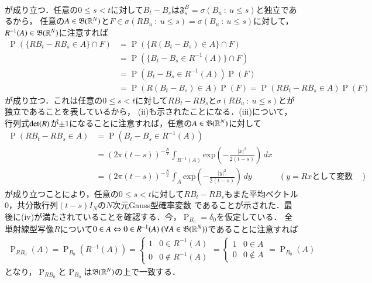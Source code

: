 \begin{prf}
\begin{description}
\begin{align}
		\end{align}
		が成り立つ．任意の$0 \leq s < t$に対して$B_t - B_s$は$\mathfrak{F}_s^B = \sigma(B_u\ :\ u \leq s)$と独立であるから，
		任意の$A \in \mathfrak{B}(\mathbb{R}^N)$と$F \in \sigma(RB_u\ :\ u \leq s) = \sigma(B_u\ :\ u \leq s)$に対して，
		$R^{-1}(A) \in \mathfrak{B}(\mathbb{R}^N)$に注意すれば
		\begin{align}
			\operatorname{P}\left(\{RB_t - RB_s \in A\} \cap F \right) 
			&= \operatorname{P}\left(\{R(B_t - B_s) \in A\} \cap F \right) \\
			&= \operatorname{P}\left(\{B_t - B_s \in R^{-1}(A)\} \cap F \right) \\
			&= \operatorname{P}\left(B_t - B_s \in R^{-1}(A)\right)\operatorname{P}(F) \\
			&= \operatorname{P}\left(R(B_t - B_s) \in A\right)\operatorname{P}(F)
			= \operatorname{P}\left(RB_t - RB_s \in A\right)\operatorname{P}(F)
		\end{align}
		が成り立つ．これは任意の$0 \leq s < t$に対して$RB_t - RB_s$と$\sigma(RB_u\ :\ u \leq s)$とが独立であることを表しているから，
		(ii)も示されたことになる．(iii)について，行列式$\operatorname{det} ( R )$が$\pm 1$になることに注意すれば，任意の$A \in \mathfrak{B}(\mathbb{R}^N)$に対して
		\begin{align}
			\operatorname{P}(RB_t - RB_s \in A) &= \operatorname{P}\left(B_t - B_s \in R^{-1}(A)\right) \\
			&= (2\pi(t-s))^{-\frac{N}{2}} \int_{R^{-1}(A)} \mathrm{exp}\left( -\frac{|x|^2}{2(t-s)} \right)\, dx \\
			&= (2\pi(t-s))^{-\frac{N}{2}} \int_{A} \mathrm{exp}\left( -\frac{|y|^2}{2(t-s)} \right)\, dy & \left(y = Rx\mbox{として変数変換}\right)
		\end{align}
		が成り立つことにより，任意の$0 \leq s < t$に対して$RB_t - RB_s$もまた平均ベクトル0，共分散行列$(t-s)I_N$の$N$次元Gauss型確率変数
		であることが示された．最後に(iv)が満たされていることを確認する．今，$\operatorname{P}_{B_0} = \delta_0$を仮定している．
		全単射線型写像$R$について$0 \in A \Leftrightarrow 0 \in R^{-1}(A)\ (\forall A \in \mathfrak{B}(\mathbb{R}^N))$であることに注意すれば
		\begin{align}
			\operatorname{P}_{RB_0}(A) = \operatorname{P}_{B_0}(R^{-1}(A)) 
			= \begin{cases}
				1 & 0 \in R^{-1}(A) \\
				0 & 0 \notin R^{-1}(A)
			\end{cases}
			= \begin{cases}
				1 & 0 \in A \\
				0 & 0 \notin A
			\end{cases}
			= \operatorname{P}_{B_0}(A)
		\end{align}
		となり，$\operatorname{P}_{RB_0}$と$\operatorname{P}_{B_0}$は$\mathfrak{B}(\mathbb{R}^N)$の上で一致する．
		\QED
\end{description}
\end{prf}
